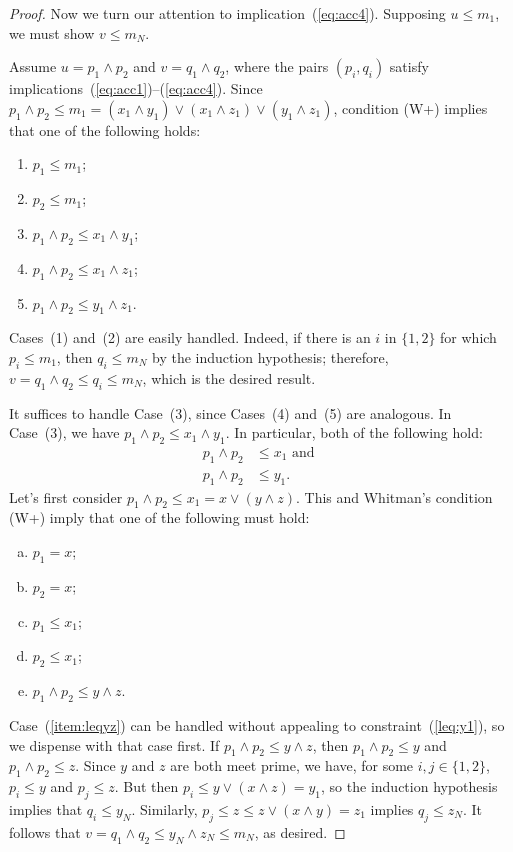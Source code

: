 \begin{proof}
Now we turn our attention to implication~(\ref{eq:acc4}).  
Supposing $u \leq m_1$, we must show $v \leq m_N$.

Assume $u  = p_1 \wedge p_2$ and $v = q_1 \wedge q_2$,
where the pairs $(p_i, q_i)$ satisfy
implications~(\ref{eq:acc1})--(\ref{eq:acc4}).
Since $p_1\wedge p_2 \leq m_1 
  = (x_1 \wedge y_1) \vee (x_1 \wedge z_1) \vee (y_1 \wedge z_1)$, 
condition (W+) implies that one of the following holds:
  \begin{enumerate}
    \item   $p_1\leq m_1$;  
    \item   $p_2 \leq m_1$;  
    \item   $p_1\wedge p_2 \leq x_1 \wedge y_1$;  
    \item   $p_1\wedge p_2 \leq x_1 \wedge z_1$;  
    \item   $p_1\wedge p_2 \leq y_1 \wedge z_1$.  
  \end{enumerate}
  Cases~(1) and~(2) are easily handled. Indeed, if there is an $i$ in 
  $\{1, 2\}$ for which $p_i \leq m_1$, then $q_i \leq m_N$ by the induction hypothesis; therefore, 
  $v = q_1 \wedge q_2 \leq q_i \leq m_N$, which is the desired result.

  It suffices to handle Case~(3), since Cases~(4) and~(5) are analogous.
  In Case~(3), we have $p_1\wedge p_2 \leq x_1 \wedge y_1$. In particular, 
  both of the following hold:
  \begin{align}
  p_1\wedge p_2 &\leq x_1 \text{ and }\label{leq:x1}\\
  p_1\wedge p_2 &\leq y_1. \label{leq:y1}
  \end{align}
  Let's first consider $p_1\wedge p_2 \leq x_1 = x \vee (y \wedge z)$.
  This and Whitman's condition (W+) imply that one of the following must hold:
  \begin{enumerate}[(a)]
    \item \label{item:p1genx}  $p_1= x$;
    \item \label{item:p2genx}  $p_2= x$;
    \item \label{item:p1leqx1}  $p_1\leq x_1$;
    \item \label{item:p2leqx1}  $p_2 \leq x_1$;
    \item \label{item:leqyz}  $p_1\wedge p_2 \leq y \wedge z$.
  \end{enumerate}
  Case~(\ref{item:leqyz}) can be handled without appealing to
  constraint~(\ref{leq:y1}), so we dispense with that case first.
  If $p_1\wedge p_2 \leq y \wedge z$, then $p_1 \wedge p_2 \leq y$ and 
  $p_1 \wedge p_2 \leq z$.  Since $y$ and $z$ are both meet prime,
  we have, for some $i, j \in \{1,2\}$, $p_i \leq y$ and $p_j\leq z$.
  But then $p_i \leq y \vee (x\wedge z) = y_1$, so the induction hypothesis
  implies that $q_i\leq y_N$.  Similarly, 
  $p_j\leq z \leq z \vee (x \wedge y) = z_1$ implies $q_j\leq z_N$.  It follows
  that $v = q_1 \wedge q_2 \leq y_N \wedge z_N \leq m_N$, as desired.
   

\end{proof}
